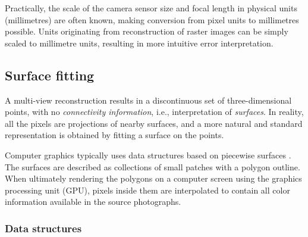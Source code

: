 
Practically, the scale of the camera sensor size and focal length in physical units (millimetres) are often known, making conversion from pixel units to millimetres possible.
Units originating from reconstruction of raster images can be simply scaled to millimetre units, resulting in more intuitive error interpretation.



\subsection{Surface fitting} %

A multi-view reconstruction results in a discontinuous set of three-dimensional points, with no \emph{connectivity information}, i.e., interpretation of \emph{surfaces}.
In reality, all the pixels are projections of nearby surfaces, and a more natural and standard representation is obtained by fitting a surface on the points.

Computer graphics typically uses data structures based on piecewise surfaces \cite{foley1990computer}.
The surfaces are described as collections of small patches with a polygon outline.
When ultimately rendering the polygons on a computer screen using the graphics processing unit (GPU), pixels inside them are interpolated to contain all color information available in the source photographs.


\subsubsection{Data structures} %


